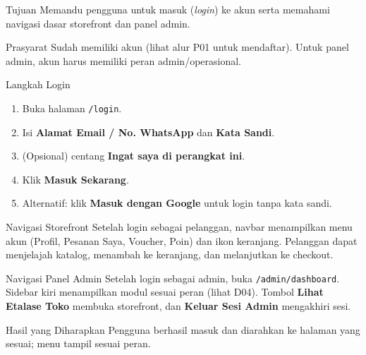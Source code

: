 
\begin{flowsection}{Tujuan}
Memandu pengguna untuk masuk (\emph{login}) ke akun serta memahami navigasi dasar
storefront dan panel admin.
\end{flowsection}

\begin{flowsection}{Prasyarat}
Sudah memiliki akun (lihat alur P01 untuk mendaftar). Untuk panel admin, akun
harus memiliki peran admin/operasional.
\end{flowsection}

\begin{flowsection}{Langkah Login}
\begin{enumerate}
  \item Buka halaman \texttt{/login}.
  \item Isi \textbf{Alamat Email / No. WhatsApp} dan \textbf{Kata Sandi}.
  \item (Opsional) centang \textbf{Ingat saya di perangkat ini}.
  \item Klik \textbf{Masuk Sekarang}.
  \item Alternatif: klik \textbf{Masuk dengan Google} untuk login tanpa kata sandi.
\end{enumerate}
\end{flowsection}


\begin{flowsection}{Navigasi Storefront}
Setelah login sebagai pelanggan, navbar menampilkan menu akun (Profil, Pesanan
Saya, Voucher, Poin) dan ikon keranjang. Pelanggan dapat menjelajah katalog,
menambah ke keranjang, dan melanjutkan ke checkout.
\end{flowsection}

\begin{flowsection}{Navigasi Panel Admin}
Setelah login sebagai admin, buka \texttt{/admin/dashboard}. Sidebar kiri
menampilkan modul sesuai peran (lihat D04). Tombol \textbf{Lihat Etalase Toko}
membuka storefront, dan \textbf{Keluar Sesi Admin} mengakhiri sesi.
\end{flowsection}

\begin{flowsection}{Hasil yang Diharapkan}
Pengguna berhasil masuk dan diarahkan ke halaman yang sesuai; menu tampil sesuai
peran.
\end{flowsection}

